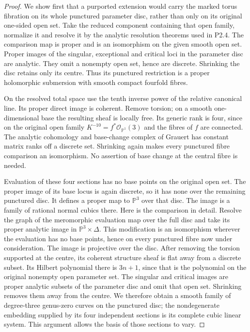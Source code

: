 \begin{proof}
We show first that a purported extension would carry the marked
torus fibration on its whole punctured parameter disc, rather
than only on its original one-sided open set.
Take the reduced component containing that open family,
normalize it and resolve it by the analytic resolution theorems
used in P2.4. The comparison map is proper and is an isomorphism
on the given smooth open set. Proper images of the singular,
exceptional and critical loci in the parameter disc are analytic.
They omit a nonempty open set, hence are discrete. Shrinking
the disc retains only its centre. Thus its punctured restriction
is a proper holomorphic submersion with smooth compact
fourfold fibres.

On the resolved total space use the tenth inverse power of the
relative canonical line. Its proper direct image is coherent.
Remove torsion; on a smooth one-dimensional base the resulting
sheaf is locally free. Its generic rank is four, since on the
original open family $K^{-10}=f^*\mathcal O_{\mathbb P^1}(3)$
and the fibres of $f$ are connected. The analytic cohomology
and base-change complex of Grauert has constant matrix ranks
off a discrete set. Shrinking again makes every punctured
fibre comparison an isomorphism. No assertion of base change
at the central fibre is needed.

Evaluation of these four sections has no base points on the
original open set. The proper image of its base locus is
again discrete, so it has none over the remaining punctured
disc. It defines a proper map to $\mathbb P^3$ over that
disc. The image is a family of rational normal cubics there.
Here is the comparison in detail. Resolve the graph of the
meromorphic evaluation map over the full disc and take its
proper analytic image in $\mathbb P^3\times\Delta$.
This modification is an isomorphism wherever the evaluation
has no base points, hence on every punctured fibre now under
consideration. The image is projective over the disc. After
removing the torsion supported at the centre, its coherent
structure sheaf is flat away from a discrete subset. Its
Hilbert polynomial there is $3n+1$, since that is the
polynomial on the original nonempty open parameter set.
The singular and critical images are proper analytic subsets
of the parameter disc and omit that open set. Shrinking
removes them away from the centre. We therefore obtain a
smooth family of degree-three genus-zero curves on the
punctured disc; the nondegenerate embedding supplied by its
four independent sections is its complete cubic linear system.
This argument allows the basis of those sections to vary.


\end{proof}
